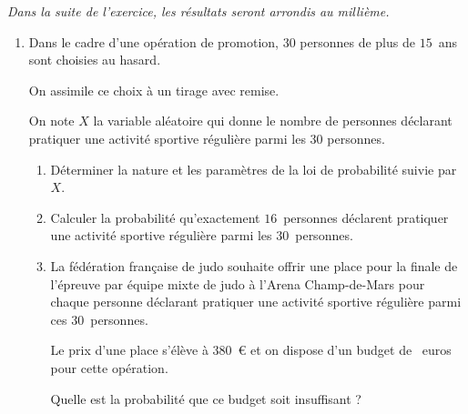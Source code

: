 \medskip

\emph{Dans la suite de l'exercice, les résultats seront arrondis au millième.}

\begin{enumerate}[resume]
\item Dans le cadre d'une opération de promotion, $30$ personnes de plus de $15$~ans sont choisies au hasard.
	
On assimile ce choix à un tirage avec remise.
	
On note $X$ la variable aléatoire qui donne le nombre de personnes déclarant pratiquer une activité sportive régulière parmi les $30$ personnes.
	\begin{enumerate}
		\item Déterminer la nature et les paramètres de la loi de probabilité suivie par $X$.
		\item Calculer la probabilité qu'exactement $16$~personnes déclarent pratiquer une activité sportive régulière parmi les $30$~personnes.
		\item La fédération française de judo souhaite offrir une place pour la finale de l'épreuve par équipe mixte de judo à l'Arena Champ-de-Mars pour chaque personne déclarant pratiquer une activité sportive régulière parmi ces $30$~personnes.
		
Le prix d'une place s'élève à 380~\euro{} et on dispose d'un budget de ~euros pour cette opération.
		
Quelle est la probabilité que ce budget soit insuffisant ?
	\end{enumerate}
\end{enumerate}
